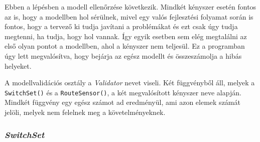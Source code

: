 Ebben a lépésben a modell ellenőrzése következik. Mindkét kényszer esetén fontos az is, hogy a modellben hol sérülnek, mivel egy valós fejlesztési folyamat során is fontos, hogy a tervező ki tudja javítani a problémákat és ezt csak úgy tudja megtenni, ha tudja, hogy hol vannak. Így egyik esetben sem elég megtalálni az első olyan pontot a modellben, ahol a kényszer nem teljesül. Ez a programban úgy lett megvalósítva, hogy bejárja az egész modellt és összeszámolja a hibás helyeket.

A modellvalidációs osztály a \emph{Validator} nevet viseli. Két függvényből áll, melyek a \texttt{SwitchSet()} és a \texttt{RouteSensor()}, a két megvalósított kényszer neve alapján. Mindkét függvény egy egész számot ad eredményül, ami azon elemek számát jelöli, melyek nem felelnek meg a követelményeknek. 

\subsubsection{\emph{SwitchSet}}

